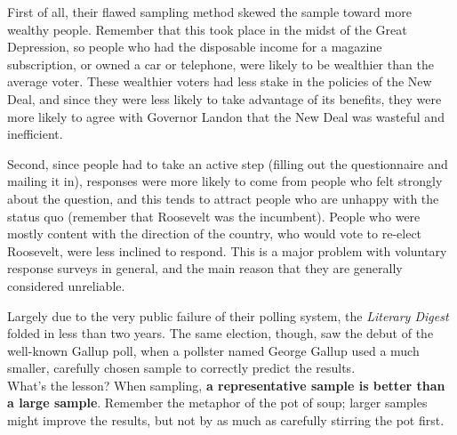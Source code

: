 First of all, their flawed sampling method skewed the sample toward more wealthy people.  Remember that this took place in the midst of the Great Depression, so people who had the disposable income for a magazine subscription, or owned a car or telephone, were likely to be wealthier than the average voter.  These wealthier voters had less stake in the policies of the New Deal, and since they were less likely to take advantage of its benefits, they were more likely to agree with Governor Landon that the New Deal was wasteful and inefficient.

Second, since people had to take an active step (filling out the questionnaire and mailing it in), responses were more likely to come from people who felt strongly about the question, and this tends to attract people who are unhappy with the status quo (remember that Roosevelt was the incumbent).  People who were mostly content with the direction of the country, who would vote to re-elect Roosevelt, were less inclined to respond.  This is a major problem with voluntary response surveys in general, and the main reason that they are generally considered unreliable.

Largely due to the very public failure of their polling system, the \emph{Literary Digest} folded in less than two years.  The same election, though, saw the debut of the well-known Gallup poll, when a pollster named George Gallup used a much smaller, carefully chosen sample to correctly predict the results.\\

What's the lesson?  When sampling, \textbf{a representative sample is better than a large sample}.  Remember the metaphor of the pot of soup; larger samples might improve the results, but not by as much as carefully stirring the pot first.

